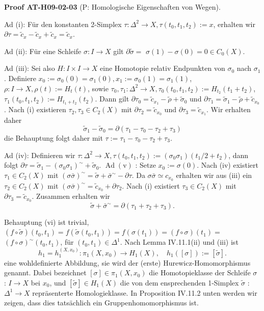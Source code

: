 \documentclass[10pt, letterpaper]{article}
\newcommand{\CustomHeading}[3]{%
  \par\medskip\noindent%
  \textbf{#1 #2} \textnormal{(#3)}.\enskip%
}
\newenvironment{PROOF}[2]{\begin{unitbox}\CustomHeading{Proof}{#1}{#2}}{\end{unitbox}}
\begin{document}
\begin{PROOF}{AT-H09-02-03}{P: Homologische Eigenschaften von Wegen}
Ad (i): Für den konstanten 2-Simplex $\tau: \Delta^2 \rightarrow X, \tau\left(t_0, t_1, t_2\right):=x$, erhalten wir $\partial \tau=\tilde{c}_x-\tilde{c}_x+\tilde{c}_x=\tilde{c}_x$. 

Ad (ii): Für eine Schleife $\sigma: I \rightarrow X$ gilt $\partial \tilde{\sigma}=$ $\sigma(1)-\sigma(0)=0 \in C_0(X)$. 

Ad (iii): Sei also $H: I \times I \rightarrow X$ eine Homotopie relativ Endpunkten von $\sigma_0$ nach $\sigma_1$. Definiere $x_0:=\sigma_0(0)=\sigma_1(0), x_1:=\sigma_0(1)=\sigma_1(1)$, $\rho: I \rightarrow X, \rho(t):=H_t(t)$, sowie $\tau_0, \tau_1: \Delta^2 \rightarrow X, \tau_0\left(t_0, t_1, t_2\right):=H_{t_2}\left(t_1+t_2\right)$, $\tau_1\left(t_0, t_1, t_2\right):=H_{t_1+t_2}\left(t_2\right)$. Dann gilt $\partial \tau_0=\tilde{c}_{x_1}-\tilde{\rho}+\tilde{\sigma}_0$ und $\partial \tau_1=\tilde{\sigma}_1-\tilde{\rho}+\tilde{c}_{x_0}$. Nach (i) existieren $\tau_2, \tau_3 \in C_2(X)$ mit $\partial \tau_2=\tilde{c}_{x_0}$ und $\partial \tau_3=\tilde{c}_{x_1}$. Wir erhalten daher
$$
\tilde{\sigma}_1-\tilde{\sigma}_0=\partial\left(\tau_1-\tau_0-\tau_2+\tau_3\right)
$$
die Behauptung folgt daher mit $\tau:=\tau_1-\tau_0-\tau_2+\tau_3$. 

Ad (iv): Definieren wir $\tau: \Delta^2 \rightarrow X, \tau\left(t_0, t_1, t_2\right):=\left(\sigma_0 \sigma_1\right)\left(t_1 / 2+t_2\right)$, dann folgt $\partial \tau=\tilde{\sigma}_1-\left(\sigma_0 \sigma_1\right)^{\sim}+\tilde{\sigma}_0$. $\operatorname{Ad}(\mathrm{v})$ : Setze $x_0:=\sigma(0)$. Nach (iv) existiert $\tau_1 \in C_2(X)$ mit $(\sigma \bar{\sigma})^{\sim}=\tilde{\sigma}+\bar{\sigma}^{\sim}-\partial \tau$. Da $\sigma \bar{\sigma} \simeq c_{x_0}$ erhalten wir aus (iii) ein $\tau_2 \in C_2(X)$ mit $(\sigma \bar{\sigma})^{\sim}=\tilde{c}_{x_0}+\partial \tau_2$. Nach (i) existiert $\tau_3 \in C_2(X)$ mit $\partial \tau_3=\tilde{c}_{x_0}$. Zusammen erhalten wir
$$
\tilde{\sigma}+\bar{\sigma}^{\sim}=\partial\left(\tau_1+\tau_2+\tau_3\right) .
$$

Behauptung (vi) ist trivial, $(f \circ \tilde{\sigma})\left(t_0, t_1\right)=f\left(\tilde{\sigma}\left(t_0, t_1\right)\right)=f\left(\sigma\left(t_1\right)\right)=(f \circ \sigma)\left(t_1\right)=$ $(f \circ \sigma)^{\sim}\left(t_0, t_1\right)$, für $\left(t_0, t_1\right) \in \Delta^1$.
Nach Lemma IV.11.1(ii) und (iii) ist
$$
h_1=h_1^{\left(X, x_0\right)}: \pi_1\left(X, x_0\right) \rightarrow H_1(X), \quad h_1([\sigma]):=[\tilde{\sigma}] .
$$
eine wohldefinierte Abbildung, sie wird der (erste) Hurewicz-Homomorphismus genannt. Dabei bezeichnet $[\sigma] \in \pi_1\left(X, x_0\right)$ die Homotopieklasse der Schleife $\sigma$ : $I \rightarrow X$ bei $x_0$, und $[\tilde{\sigma}] \in H_1(X)$ die von dem ensprechenden 1-Simplex $\tilde{\sigma}$ : $\Delta^1 \rightarrow X$ repräsenterte Homologieklasse. In Proposition IV.11.2 unten werden wir zeigen, dass dies tatsächlich ein Gruppenhomomorphismus ist.
\end{PROOF}
\end{document}
